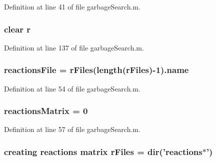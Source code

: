 Definition at line 41 of file garbage\-Search.\-m.

\hypertarget{a00027_ac862e7284527eb913b1351c8bfb8e079}{
\subsubsection[{r}]{\setlength{\rightskip}{0pt plus 5cm}clear r}}\label{a00027_ac862e7284527eb913b1351c8bfb8e079}


Definition at line 137 of file garbage\-Search.\-m.

\hypertarget{a00027_a4c72dba1fe2ee2fbcc699262a8d0c624}{
\subsubsection[{reactions\-File}]{\setlength{\rightskip}{0pt plus 5cm}reactions\-File = {\bf r\-Files}(length({\bf r\-Files})-\/1).{\bf name}}}\label{a00027_a4c72dba1fe2ee2fbcc699262a8d0c624}


Definition at line 54 of file garbage\-Search.\-m.

\hypertarget{a00027_ac52097a2745fcef31eb175d2e9485845}{
\subsubsection[{reactions\-Matrix}]{\setlength{\rightskip}{0pt plus 5cm}reactions\-Matrix = 0}}\label{a00027_ac52097a2745fcef31eb175d2e9485845}


Definition at line 57 of file garbage\-Search.\-m.

\hypertarget{a00027_ad75735665492cabd747370126464fddf}{
\subsubsection[{r\-Files}]{\setlength{\rightskip}{0pt plus 5cm}creating {\bf reactions} matrix r\-Files = dir('{\bf reactions}$\ast$')}}\label{a00027_ad75735665492cabd747370126464fddf}


